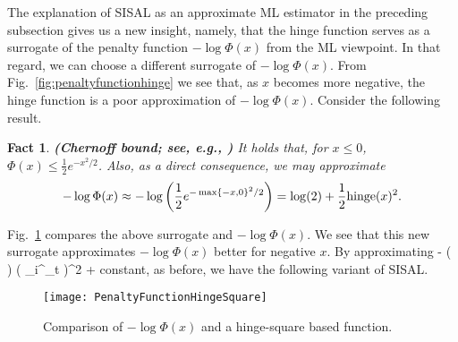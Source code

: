 \documentclass[10pt,twocolumn,twoside]{IEEEtran}
\newtheorem{Fact}{Fact}
\begin{document}
The explanation of SISAL as an approximate ML estimator in the preceding subsection gives us a new insight, namely, that the hinge function serves as a surrogate of the penalty function $-\log \Phi(x)$ from the ML viewpoint.
In that regard, we can choose a different surrogate of $-\log \Phi(x)$.
From Fig.~\ref{fig:penaltyfunctionhinge} we see that, as $x$ becomes more negative, the hinge function is a poor approximation of $-\log \Phi(x)$.
Consider the following result.
\begin{Fact} {\bf (Chernoff bound; see, e.g.,  \cite{verdu1998multiuser})} \label{fac:hinge2}
	It holds that, for $x \leq 0$, $\Phi(x) \leq \frac{1}{2} e^{-x^2 /2 }$.
	Also, as a direct consequence, we may approximate
	\[
	-\log \Phi(x) \approx -\log \left(  \frac{1}{2} e^{- \max\{-x,0 \} ^2 /2 }  \right)
	= \log(2) + \frac{1}{2} {\rm hinge}(x)^2.	
	\]
\end{Fact}
Fig.~\ref{fig:penaltyfunctionhingesquare} compares the above surrogate and $-\log\Phi(x)$.
We see that this new surrogate approximates $-\log\Phi(x)$ better for negative $x$.
By approximating
\beq
-  \log \Phi \left(  \right)
\approx \lambda {}( \bb_i^\top \by_t )^2 + {\rm constant},
\label{eq:heuristic_hinge2}
\eeq
as before, we have the following variant of SISAL.

\medskip
\begin{center}
	\noindent {}
\end{center}


\begin{figure}[hbt]
	\centering \texttt{[image: PenaltyFunctionHingeSquare]}
	\caption{Comparison of $-\log \Phi(x)$ and a hinge-square based function.}
	\label{fig:penaltyfunctionhingesquare}
\end{figure}
\end{document}
